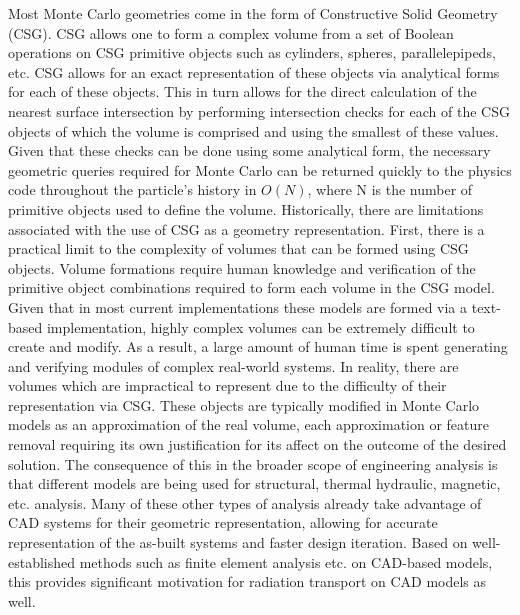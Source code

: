 \documentclass[12pt, a4paper]{article}
\begin{document}
Most Monte Carlo geometries come in the form of Constructive Solid Geometry (CSG). CSG allows one to form a complex volume from a set of Boolean operations on CSG primitive objects such as cylinders, spheres, parallelepipeds, etc. CSG allows for an exact representation of these objects via analytical forms for each of these objects. This in turn allows for the direct calculation of the nearest surface intersection by performing intersection checks for each of the CSG objects of which the volume is comprised and using the smallest of these values. Given that these checks can be done using some analytical form, the necessary geometric queries required for Monte Carlo can be returned quickly to the physics code throughout the particle's history in $O(N)$, where N is the number of primitive objects used to define the volume. Historically, there are limitations associated with the use of CSG as a geometry representation. First, there is a practical limit to the complexity of volumes that can be formed using CSG objects. Volume formations require human knowledge and verification of the primitive object combinations required to form each volume in the CSG model. Given that in most current implementations these models are formed via a text-based implementation, highly complex volumes can be extremely difficult to create and modify. As a result, a large amount of human time is spent generating and verifying modules of complex real-world systems. In reality, there are volumes which are impractical to represent due to the difficulty of their representation via CSG. These objects are typically modified in Monte Carlo models as an approximation of the real volume, each approximation or feature removal requiring its own justification for its affect on the outcome of the desired solution. The consequence of this in the broader scope of engineering analysis is that different models are being used for structural, thermal hydraulic, magnetic, etc. analysis. Many of these other types of analysis already take advantage of CAD systems for their geometric representation, allowing for accurate representation of the as-built systems and faster design iteration. Based on well-established methods such as finite element analysis etc. on CAD-based models, this provides significant motivation for radiation transport on CAD models as well.
\end{document}

